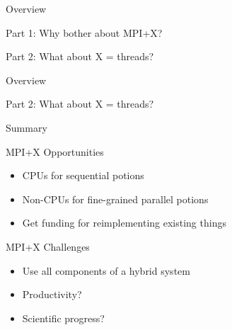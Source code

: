 

\begin{frame}{Overview}

\begin{block}{Part 1: Why bother about MPI+X?} \end{block}
\begin{block}{Part 2: What about X = threads?} \end{block}

\end{frame}




\begin{frame}{Overview}
\begin{block}{Part 2: What about X = threads?} \end{block}
\end{frame}





\begin{frame}{Summary}

 \begin{block}{MPI+X Opportunities}
   \begin{itemize}
    \item CPUs for sequential potions
    \item Non-CPUs for fine-grained parallel potions
    \item Get funding for reimplementing existing things
   \end{itemize}
 \end{block}

 \begin{block}{MPI+X Challenges}
   \begin{itemize}
    \item Use all components of a hybrid system
    \item Productivity?
    \item Scientific progress?
   \end{itemize}
 \end{block}

\end{frame}

